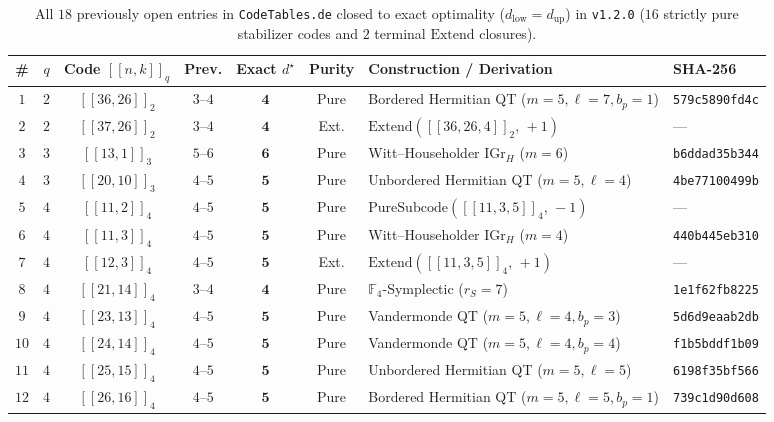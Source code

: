 \documentclass[11pt,a4paper]{article}
\theoremstyle{remark}
\begin{document}
\begin{table}[htbp]
\centering
\caption{All $18$ previously open entries in \texttt{CodeTables.de} closed to exact optimality ($d_{\mathrm{low}} = d_{\mathrm{up}}$) in \texttt{v1.2.0} ($16$ strictly pure stabilizer codes and $2$ terminal $\mathrm{Extend}$ closures).}\label{tab:exact18}
\vspace{4pt}
{\footnotesize\setlength{\tabcolsep}{5.2pt}\renewcommand{\arraystretch}{1.12}
\begin{tabular}{@{}ccccccll@{}}
\toprule
\# & $q$ & Code $[[n,k]]_q$ & Prev. & \textbf{Exact $d^\star$} & Purity & Construction / Derivation & SHA-256 \\
\midrule
$1$ & $2$ & $[[36,26]]_{2}$ & $3\text{--}4$ & $\mathbf{4}$ & Pure & Bordered Hermitian QT ($m=5, \ell=7, b_p=1$) & \texttt{579c5890fd4c} \\
$2$ & $2$ & $[[37,26]]_{2}$ & $3\text{--}4$ & $\mathbf{4}$ & Ext. & $\mathrm{Extend}([[36,26,4]]_2,\,+1)$ & --- \\
\midrule
$3$ & $3$ & $[[13,1]]_{3}$ & $5\text{--}6$ & $\mathbf{6}$ & Pure & Witt--Householder $\mathrm{IGr}_H$ ($m=6$) & \texttt{b6ddad35b344} \\
$4$ & $3$ & $[[20,10]]_{3}$ & $4\text{--}5$ & $\mathbf{5}$ & Pure & Unbordered Hermitian QT ($m=5, \ell=4$) & \texttt{4be77100499b} \\
\midrule
$5$ & $4$ & $[[11,2]]_{4}$ & $4\text{--}5$ & $\mathbf{5}$ & Pure & $\mathrm{PureSubcode}([[11,3,5]]_4,\,-1)$ & --- \\
$6$ & $4$ & $[[11,3]]_{4}$ & $4\text{--}5$ & $\mathbf{5}$ & Pure & Witt--Householder $\mathrm{IGr}_H$ ($m=4$) & \texttt{440b445eb310} \\
$7$ & $4$ & $[[12,3]]_{4}$ & $4\text{--}5$ & $\mathbf{5}$ & Ext. & $\mathrm{Extend}([[11,3,5]]_4,\,+1)$ & --- \\
$8$ & $4$ & $[[21,14]]_{4}$ & $3\text{--}4$ & $\mathbf{4}$ & Pure & $\mathbb{F}_4$-Symplectic ($r_S=7$) & \texttt{1e1f62fb8225} \\
$9$ & $4$ & $[[23,13]]_{4}$ & $4\text{--}5$ & $\mathbf{5}$ & Pure & Vandermonde QT ($m=5, \ell=4, b_p=3$) & \texttt{5d6d9eaab2db} \\
$10$ & $4$ & $[[24,14]]_{4}$ & $4\text{--}5$ & $\mathbf{5}$ & Pure & Vandermonde QT ($m=5, \ell=4, b_p=4$) & \texttt{f1b5bddf1b09} \\
$11$ & $4$ & $[[25,15]]_{4}$ & $4\text{--}5$ & $\mathbf{5}$ & Pure & Unbordered Hermitian QT ($m=5, \ell=5$) & \texttt{6198f35bf566} \\
$12$ & $4$ & $[[26,16]]_{4}$ & $4\text{--}5$ & $\mathbf{5}$ & Pure & Bordered Hermitian QT ($m=5, \ell=5, b_p=1$) & \texttt{739c1d90d608} \\

\end{tabular}}
\end{table}
\end{document}
